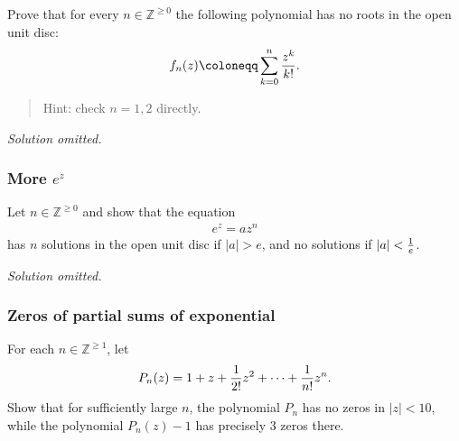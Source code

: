 \begin{problem}[?]

Prove that for every \(n\in {\mathbb{Z}}^{\geq 0}\) the following
polynomial has no roots in the open unit disc:
\begin{align*}
f_n(z) \coloneqq\sum_{k=0}^n {z^k \over k!}
.\end{align*}

\begin{quote}
Hint: check \(n=1,2\) directly.
\end{quote}

\end{problem}

\emph{Solution omitted.}

\hypertarget{more-ez}{%
\subsubsection{\texorpdfstring{More
\(e^z\)}{More e\^{}z}}\label{more-ez}}

\begin{problem}[?]

Let \(n\in {\mathbb{Z}}^{\geq 0}\) and show that the equation
\begin{align*}
e^z = az^n
\end{align*}
has \(n\) solutions in the open unit disc if
\({\left\lvert {a} \right\rvert} > e\), and no solutions if
\({\left\lvert {a} \right\rvert} < {1\over e}\).

\end{problem}

\emph{Solution omitted.}

\hypertarget{zeros-of-partial-sums-of-exponential}{%
\subsubsection{Zeros of partial sums of
exponential}\label{zeros-of-partial-sums-of-exponential}}

\begin{problem}[?]

For each \(n\in {\mathbb{Z}}^{\geq 1}\), let
\begin{align*}
P_n(z) = 1 + z + {1\over 2!} z^2 + \cdots + {1\over n!}z^n
.\end{align*}
Show that for sufficiently large \(n\), the polynomial \(P_n\) has no
zeros in \({\left\lvert {z} \right\rvert} < 10\), while the polynomial
\(P_n(z) - 1\) has precisely 3 zeros there.

\end{problem}

